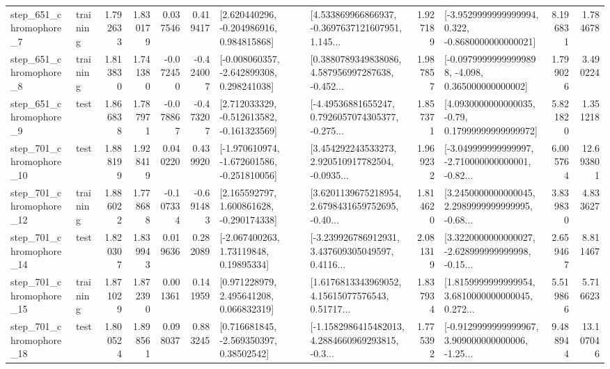 \begin{tabular}{llrrrrllrlrr}
   step\_651\_chromophore\_7 &  training &      1.792633 &    1.830179 &      0.037546 &  0.419417 &    [2.620440296, -0.204986916, 0.984815868] &  [4.533869966866937, -0.3697637121607951, 1.145... &       1.927189 &  [-3.9529999999999994, 0.322, -0.8680000000000021] &            8.196831 &          1.784678 \\
   step\_651\_chromophore\_8 &  training &      1.813830 &    1.741380 &     -0.072450 & -0.424007 &   [-0.008060357, -2.642899308, 0.298241038] &  [0.3880789349838086, 4.587956997287638, -0.452... &       1.987857 &  [-0.09799999999999898, -4.098, 0.365000000000002] &            1.799026 &          3.490224 \\
   step\_651\_chromophore\_9 &      test &      1.866838 &    1.787971 &     -0.078867 & -0.473207 &   [2.712033329, -0.512613582, -0.161323569] &  [-4.49536881655247, 0.7926057074305377, -0.275... &       1.857371 &   [4.0930000000000035, -0.79, 0.17999999999999972] &            5.821820 &          1.351218 \\
  step\_701\_chromophore\_10 &      test &      1.888199 &    1.928419 &      0.040220 &  0.439920 &  [-1.970610974, -1.672601586, -0.251810056] &  [3.454292243533273, 2.920510917782504, -0.0935... &       1.969232 &  [-3.049999999999997, -2.710000000000001, -0.82... &            6.005764 &         12.693801 \\
  step\_701\_chromophore\_12 &  training &      1.886022 &    1.778688 &     -0.107334 & -0.691483 &    [2.165592797, 1.600861628, -0.290174338] &  [3.6201139675218954, 2.6798431659752695, -0.40... &       1.814620 &  [3.2450000000000045, 2.2989999999999995, -0.68... &            3.839830 &          4.833627 \\
  step\_701\_chromophore\_14 &      test &      1.820307 &    1.839943 &      0.019636 &  0.282089 &      [-2.067400263, 1.73119848, 0.19895334] &  [-3.239926786912931, 3.437609305049597, 0.4116... &       2.081319 &  [3.3220000000000027, -2.628999999999998, -0.15... &            2.659467 &          8.811467 \\
  step\_701\_chromophore\_15 &  training &      1.871029 &    1.872390 &      0.001361 &  0.141959 &     [0.971228979, 2.495641208, 0.066832319] &  [1.6176813343969052, 4.15615077576543, 0.51717... &       1.837934 &  [1.8159999999999954, 3.6810000000000045, 0.272... &            5.519866 &          5.716623 \\
  step\_701\_chromophore\_18 &      test &      1.800524 &    1.898561 &      0.098037 &  0.883245 &     [0.716681845, -2.569350397, 0.38502542] &  [-1.1582986415482013, 4.2884660969293815, -0.3... &       1.775392 &  [-0.9129999999999967, 3.909000000000006, -1.25... &            9.488944 &         13.107046 \\

\end{tabular}
